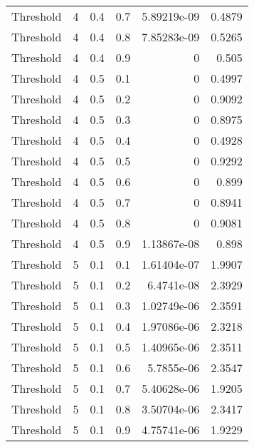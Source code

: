 \documentclass{article}
\begin{document}
\begin{longtable}[H]{lrrrrr}
 Threshold      &       4 &   0.4 &            0.7 &   5.89219e-09 &          0.4879 \\
 Threshold      &       4 &   0.4 &            0.8 &   7.85283e-09 &          0.5265 \\
 Threshold      &       4 &   0.4 &            0.9 &   0           &          0.505  \\
 Threshold      &       4 &   0.5 &            0.1 &   0           &          0.4997 \\
 Threshold      &       4 &   0.5 &            0.2 &   0           &          0.9092 \\
 Threshold      &       4 &   0.5 &            0.3 &   0           &          0.8975 \\
 Threshold      &       4 &   0.5 &            0.4 &   0           &          0.4928 \\
 Threshold      &       4 &   0.5 &            0.5 &   0           &          0.9292 \\
 Threshold      &       4 &   0.5 &            0.6 &   0           &          0.899  \\
 Threshold      &       4 &   0.5 &            0.7 &   0           &          0.8941 \\
 Threshold      &       4 &   0.5 &            0.8 &   0           &          0.9081 \\
 Threshold      &       4 &   0.5 &            0.9 &   1.13867e-08 &          0.898  \\
 Threshold      &       5 &   0.1 &            0.1 &   1.61404e-07 &          1.9907 \\
 Threshold      &       5 &   0.1 &            0.2 &   6.4741e-08  &          2.3929 \\
 Threshold      &       5 &   0.1 &            0.3 &   1.02749e-06 &          2.3591 \\
 Threshold      &       5 &   0.1 &            0.4 &   1.97086e-06 &          2.3218 \\
 Threshold      &       5 &   0.1 &            0.5 &   1.40965e-06 &          2.3511 \\
 Threshold      &       5 &   0.1 &            0.6 &   5.7855e-06  &          2.3547 \\
 Threshold      &       5 &   0.1 &            0.7 &   5.40628e-06 &          1.9205 \\
 Threshold      &       5 &   0.1 &            0.8 &   3.50704e-06 &          2.3417 \\
 Threshold      &       5 &   0.1 &            0.9 &   4.75741e-06 &          1.9229 \\

\end{longtable}
\end{document}
